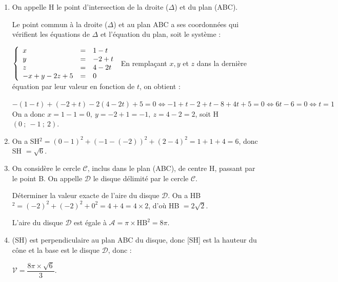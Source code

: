 \documentclass[10pt]{article}
\providecommand{\R}{\mathbb{R}}
\providecommand{\vect}[1]{\overrightarrow{#1}}
\begin{document}
\begin{enumerate}
La droite ($\Delta$) orthogonale au plan ABC a un vecteur directeur colinéaire au vecteur $\vect{n}$.

Donc $M(x~;~y~;~z) \in (\Delta) \iff \vect{\text{S}M} = t\vect{n}$, avec $t \in \R$, ce qui se traduit par les équations paramétriques:

$\left\{\begin{array}{l c l}
x - 1&=&- t\\
y - (- 2)&=&1t\\
z -4&=&-2t
\end{array}\right.\iff \left\{\begin{array}{l c l}
x &=&1 - t\\
y &=& -2 + t\\
z &=&4 -2t
\end{array}\right.$\quad $t \in \R \iff M(x~;~y~;~z) \in (\Delta) $.
\item On appelle H le point d'intersection de la droite ($\Delta$) et du plan (ABC).


Le point commun à la droite ($\Delta$) et au plan ABC a ses coordonnées qui vérifient les équations de $\Delta$ et l'équation du plan, soit le système :

$\left\{\begin{array}{l c l} 
x &=&1 - t\\
y &=& -2 + t\\
z &=&4 -2t\\
-x + y - 2z + 5 &=& 0
\end{array}\right.$ En remplaçant $x, y$ et $z$ dans la dernière équation par leur valeur en fonction de $t$, on obtient :

$- (1 - t) + (-2 + t) - 2(4 - 2t) + 5 = 0 \iff - 1 + t - 2 + t - 8 + 4t + 5 = 0 \iff 6t - 6 = 0 
\iff t = 1$
On a donc $x = 1 - 1 = 0, \: y = - 2 + 1 = - 1, \: z = 4 - 2 = 2$, soit H$(0~;~- 1~;~2)$.

\item 
On a SH$^2 = (0 - 1)^2 + (- 1 - (-2))^2 + (2 - 4)^2 = 1 + 1 + 4 = 6$, donc SH $= \sqrt{6}$.
\item On considère le cercle $\mathcal{C}$, inclus dans le plan (ABC), de centre H, passant par le
point B. On appelle $\mathcal{D}$ le disque délimité par le cercle $\mathcal{C}$.

Déterminer la valeur exacte de l'aire du disque $\mathcal{D}$.
On a HB$^2 = (- 2)^2 + (- 2)^2 + 0^2 = 4 + 4 = 4 \times 2$, d'où HB $= 2\sqrt 2$.

L'aire du disque $\mathcal{D}$ est égale à $\mathcal{A}  = \pi \times \text{HB}^2 = 8\pi$.
\item 

(SH) est perpendiculaire au plan ABC du disque, donc [SH] est la hauteur du cône et la base est le disque $\mathcal{D}$, donc :

$\mathcal{V} = \dfrac{8\pi \times \sqrt{6}}{3}$.
\end{enumerate}

\medskip
\end{document}
